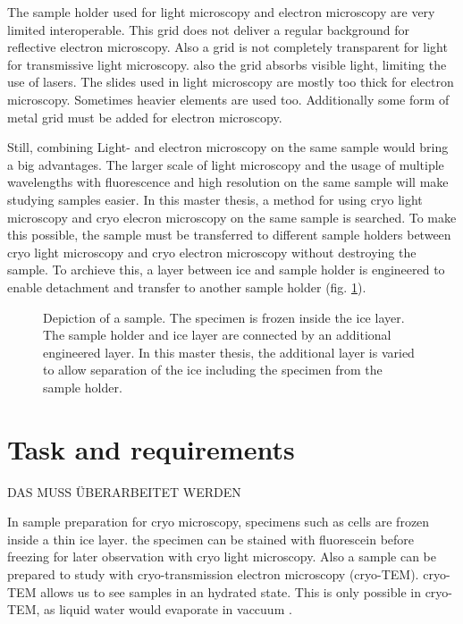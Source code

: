The sample holder used for light microscopy and electron microscopy are very limited interoperable. This grid does not deliver a regular background for reflective electron microscopy. Also a grid is not completely transparent for light for transmissive light microscopy. also the grid absorbs visible light, limiting the use of lasers. The slides used in light microscopy are mostly too thick for electron microscopy. Sometimes heavier elements are used too. Additionally some form of metal grid must be added for electron microscopy. 

Still, combining Light- and electron microscopy on the same sample would bring a big advantages. The larger scale of light microscopy and the usage of multiple wavelengths with fluorescence and high resolution on the same sample will make studying samples easier. In this master thesis, a method for using cryo light microscopy and cryo elecron microscopy on the same sample is searched. To make this possible, the sample must be transferred to different sample holders between cryo light microscopy and cryo electron microscopy without destroying the sample. To archieve this, a layer between  ice and sample holder is engineered to enable detachment and transfer to another sample holder (fig. \ref{fig:layersingeneral}).

\begin{figure}[hbt!]
	\centering
	
	\caption{Depiction of a sample. The specimen is frozen inside the ice layer. The sample holder and ice layer are connected by an additional engineered layer. In this master thesis, the additional layer is varied to allow separation of the ice including the specimen from the sample holder.}
	\label{fig:layersingeneral}
\end{figure}


\section{Task and requirements}

DAS MUSS ÜBERARBEITET WERDEN

In sample preparation for cryo microscopy, specimens such as cells are frozen inside a thin ice layer. the specimen can be stained with fluorescein before freezing for later observation with cryo light microscopy. Also a sample can be prepared to study with cryo-transmission electron microscopy (cryo-TEM). cryo-TEM allows us to see samples in an hydrated state. This is only possible in cryo-TEM, as liquid water would evaporate in vaccuum \cite{Danino.2012}.


